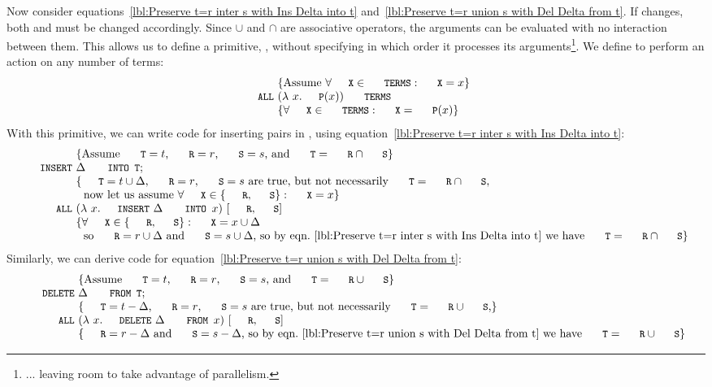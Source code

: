 \documentclass{svproc}
\begin{document}
	Now consider equations~\ref{lbl:Preserve t=r inter s with Ins Delta into t} and~\ref{lbl:Preserve t=r union s with Del Delta from t}.
	If  changes, both  and  must be changed accordingly.
	Since $\cup$ and $\cap$ are associative operators, the arguments can be evaluated with no interaction between them.
	This allows us to define a primitive, , without specifying in which order it processes its arguments\footnote{... leaving room to take advantage of parallelism.}.
	We define  to perform an action on any number of terms:
\[\begin{array}{r@{~}l}
&\{\text{Assume }\forall\code{X}\in\code{TERMS}:\code{X}=x\}\\
\code{ALL}&(\lambda\ x.\code{P}(x))\ \code{TERMS}\\
&\{\forall\code{X}\in\code{TERMS}:\code{X}=\code{P}(x)\}
\end{array}\]
	With this primitive, we can write code for inserting pairs in ,
	using equation~\ref{lbl:Preserve t=r inter s with Ins Delta into t}:
\[\begin{array}{r@{~}l}
&\{\text{Assume $\code{T}=t$, $\code{R}=r$, $\code{S}=s$, and $\code{T}=\code{R}\cap\code{S}$}\}\\
\code{INSERT}&\Delta\code{ INTO T};\\
&\{\text{$\code{T}=t\cup\Delta$, $\code{R}=r$, $\code{S}=s$ are true, but not necessarily $\code{T}=\code{R}\cap\code{S}$,}\\
&~~\text{now let us assume }\forall\code{X}\in\{\code{R},\code{S}\}:\code{X}=x\}\\
\code{ALL}&(\lambda\ x.\code{INSERT}\ \Delta\code{ INTO }x)\ [\code{R},\code{S}]\\
&\{\forall\code{X}\in\{\code{R},\code{S}\}:\code{X}=x\cup\Delta\\
&~~\text{so }\code{R}=r\cup\Delta\text{ and }\code{S}=s\cup\Delta\text{, so by eqn.~\ref{lbl:Preserve t=r inter s with Ins Delta into t} we have }\code{T}=\code{R}\cap\code{S}\}
\end{array}\]
	Similarly, we can derive code for equation~\ref{lbl:Preserve t=r union s with Del Delta from t}:
\[\begin{array}{r@{~}l}
&\{\text{Assume $\code{T}=t$, $\code{R}=r$, $\code{S}=s$, and $\code{T}=\code{R}\cup\code{S}$}\}\\
\code{DELETE}&\Delta\code{ FROM T};\\
&\{\text{$\code{T}=t-\Delta$, $\code{R}=r$, $\code{S}=s$ are true, but not necessarily $\code{T}=\code{R}\cup\code{S}$,}\}\\
\code{ALL}&(\lambda\ x.\code{DELETE}\ \Delta\code{ FROM }x)\ [\code{R},\code{S}]\\
&\{\code{R}=r-\Delta\text{ and }\code{S}=s-\Delta\text{, so by eqn.~\ref{lbl:Preserve t=r union s with Del Delta from t} we have }\code{T}=\code{R}\cup\code{S}\}
\end{array}\]
\end{document}
